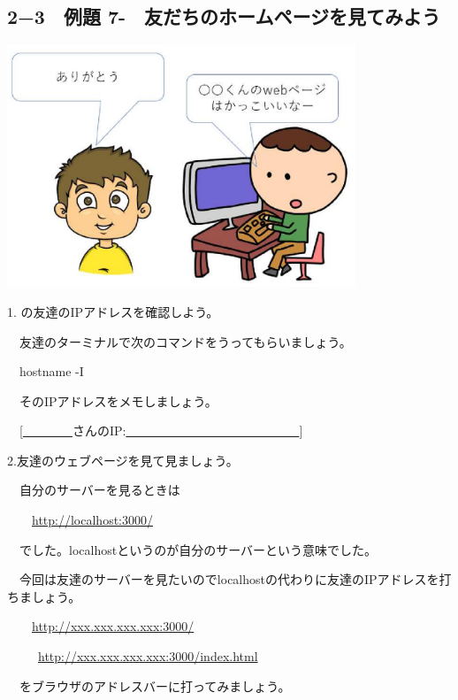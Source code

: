 \documentclass[a4paper,12pt,dvipdfmx]{jarticle}
\newcounter{Exercise}
\renewcommand\theExercise{\textbf{例題 7-\arabic{Exercise}}}
\begin{document}
\bigskip


\bigskip


\clearpage\subsection*{2−3　\theExercise　友だちのホームページを見てみよう}
\addtocounter{Exercise}{-1}\label{friend}


\centering
\includegraphics[width=10.423cm]{ome7-img042}
\flushleft


\bigskip



1.
の友達のIPアドレスを確認しよう。

\ \ 友達のターミナルで次のコマンドをうってもらいましょう。

\ \ hostname -I

\ \ そのIPアドレスをメモしましょう。

\ \ [\underline{　　　　}さんのIP:\underline{　　　　　　　　　　　　　　}]


\bigskip

2.友達のウェブページを見て見ましょう。

\ \ 自分のサーバーを見るときは

\ \ 　\url{http://localhost:3000/}

\ \ でした。localhostというのが自分のサーバーという意味でした。

\ \ 今回は友達のサーバーを見たいのでlocalhostの代わりに友達のIPアドレスを打ちましょう。

\ \ 　\url{http://xxx.xxx.xxx.xxx:3000/}

\ \ \ 　\url{http://xxx.xxx.xxx.xxx:3000/index.html}

\ \ をブラウザのアドレスバーに打ってみましょう。
\end{document}
